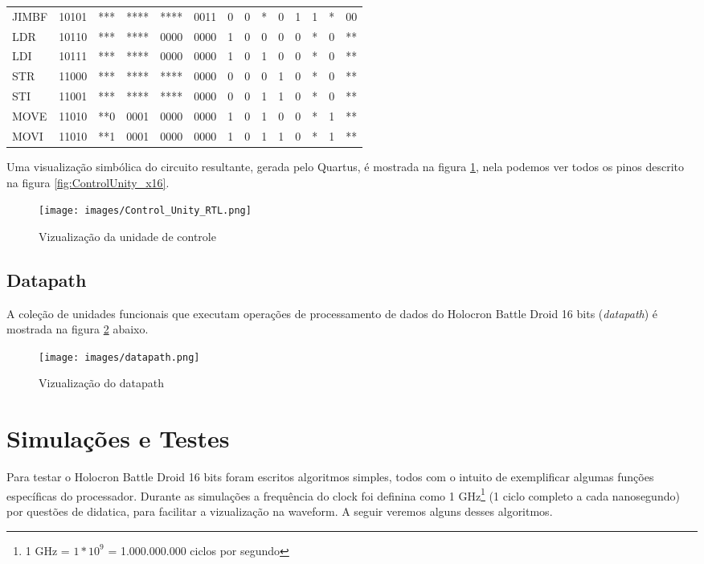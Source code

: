 \documentclass{article}
\newcommand\tab[1][0.50cm]{\hspace*{#1}}
\begin{document}
\begin{longtable}{l c c c c c c c c c c c c c}
					JIMBF	& 10101	& ***	&****	&****	&0011	&0	&0	&*	&0	&1	&1	&*	&00\\
					LDR 	& 10110	& ***	&****	&0000	&0000	&1	&0	&0	&0	&0	&*	&0	&**\\
					LDI 	& 10111	& ***	&****	&0000	&0000	&1	&0	&1	&0	&0	&*	&0	&**\\
					STR 	& 11000	& ***	&****	&****	&0000	&0	&0	&0	&1	&0	&*	&0	&**\\
					STI		& 11001	& ***	&****	&****	&0000	&0	&0	&1	&1	&0	&*	&0	&**\\
					MOVE	& 11010	& **0	&0001	&0000	&0000	&1	&0	&1	&0	&0	&*	&1	&**\\
					MOVI	& 11010	& **1	&0001	&0000	&0000	&1	&0	&1	&1	&0	&*	&1	&**\\
				\end{longtable}
			\tab Uma visualiza\c{c}\~{a}o simb\'{o}lica do circuito resultante, gerada pelo Quartus, \'{e} mostrada na figura \ref{fig:ControlUnity_x16_RTL}, nela podemos ver todos os pinos descrito na figura \ref{fig:ControlUnity_x16}.
				\begin{figure}[H]
					\centering
					\caption[Vizualiza\c{c}\~{a}o da unidade de controle]{Vizualiza\c{c}\~{a}o da unidade de controle}
					\label{fig:ControlUnity_x16_RTL}
					\texttt{[image: images/Control\_Unity\_RTL.png]}
				\end{figure}
			
			
		\subsection{Datapath}
			\tab A cole\c{c}\~{a}o de unidades funcionais que executam opera\c{c}\~{o}es de processamento de dados do Holocron Battle Droid 16 bits (\textit{datapath}) \'{e} mostrada na figura \ref{fig:Datapath_RTL} abaixo.		
			
			\begin{figure}[H]
				\centering
				\caption[Datapath]{Vizualiza\c{c}\~{a}o do datapath}
				\label{fig:Datapath_RTL}
				\texttt{[image: images/datapath.png]}
			\end{figure}
	
	\cleardoublepage
	\section{Simula\c{c}\~{o}es e Testes}
		\tab Para testar o Holocron Battle Droid 16 bits foram escritos algoritmos simples, todos com o intuito de exemplificar algumas fun\c{c}\~{o}es espec\'{i}ficas do processador.  Durante as simula\c{c}\~oes a frequ\^{e}ncia do clock foi definina como 1 GHz\footnote{ 1 GHz = $1 * 10^{9}$ = 1.000.000.000 ciclos por segundo} (1 ciclo completo a cada nanosegundo) por quest\~{o}es de didatica, para facilitar a vizualiza\c{c}\~ao na waveform. A seguir veremos alguns desses algoritmos.
		
\end{document}

